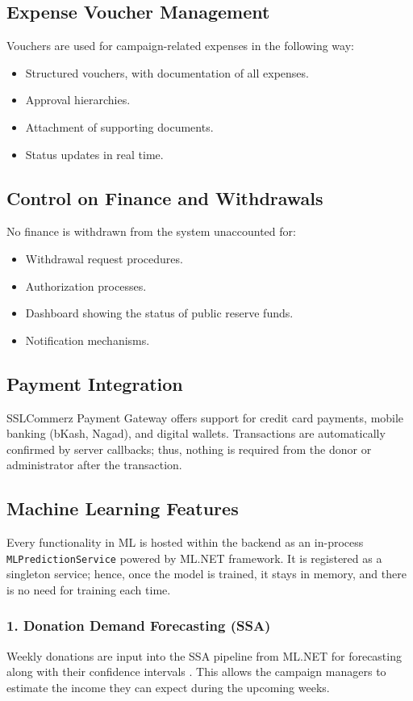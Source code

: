 \documentclass{thesis-library}
\begin{document}
\subsection{Expense Voucher Management}
Vouchers are used for campaign-related expenses in the following way:
\begin{itemize}
    \item Structured vouchers, with documentation of all expenses.
    \item Approval hierarchies.
    \item Attachment of supporting documents.
    \item Status updates in real time.
\end{itemize}

\subsection{Control on Finance and Withdrawals}
No finance is withdrawn from the system unaccounted for:
\begin{itemize}
    \item Withdrawal request procedures.
    \item Authorization processes.
    \item Dashboard showing the status of public reserve funds.
    \item Notification mechanisms.
\end{itemize}

\subsection{Payment Integration}
SSLCommerz Payment Gateway offers support for credit card payments, mobile banking (bKash, Nagad), and digital wallets. Transactions are automatically confirmed by server callbacks; thus, nothing is required from the donor or administrator after the transaction.

\subsection{Machine Learning Features}
Every functionality in ML is hosted within the backend as an in-process \texttt{MLPredictionService} powered by ML.NET framework. It is registered as a singleton service; hence, once the model is trained, it stays in memory, and there is no need for training each time.

\subsubsection{1. Donation Demand Forecasting (SSA)}
Weekly donations are input into the SSA pipeline from ML.NET for forecasting along with their confidence intervals \cite{chen2022machine,hassani2007singular}. This allows the campaign managers to estimate the income they can expect during the upcoming weeks.
\end{document}
